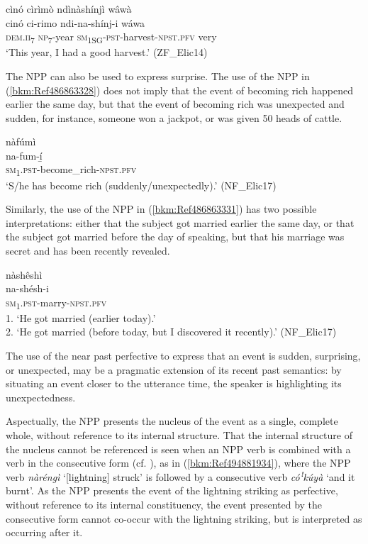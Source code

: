 \ea
\label{bkm:Ref402270667}
cìnó cìrìmò ndìnàshínjì wâwà\\
\gll cinó    ci-rimo  ndi-na-shínj-i      wáwa\\
\textsc{dem}.\textsc{ii}\textsubscript{7}  \textsc{np}\textsubscript{7}-year  \textsc{sm}\textsubscript{1SG}-\textsc{pst}-harvest-\textsc{npst}.\textsc{pfv}  very\\
\glt ‘This year, I had a good harvest.’ (ZF\_Elic14)
\z

The NPP can also be used to express surprise. The use of the NPP in (\ref{bkm:Ref486863328}) does not imply that the event of becoming rich happened earlier the same day, but that the event of becoming rich was unexpected and sudden, for instance, someone won a jackpot, or was given 50 heads of cattle.

\ea
\label{bkm:Ref486863328}
\glll nàfúmì\\
na-fum-í̲\\
\textsc{sm}\textsubscript{1}.\textsc{pst}-become\_rich-\textsc{npst}.\textsc{pfv}\\
\glt ‘S/he has become rich (suddenly/unexpectedly).’ (NF\_Elic17)
\z

Similarly, the use of the NPP in (\ref{bkm:Ref486863331}) has two possible interpretations: either that the subject got married earlier the same day, or that the subject got married before the day of speaking, but that his marriage was secret and has been recently revealed.

\ea
\label{bkm:Ref486863331}
nàshêshì\\
na-shésh-i\\
\textsc{sm}\textsubscript{1}.\textsc{pst}-marry-\textsc{npst}.\textsc{pfv}\\
1. ‘He got married (earlier today).’\\
2. ‘He got married (before today, but I discovered it recently).’ (NF\_Elic17)
\z

The use of the near past perfective to express that an event is sudden, surprising, or unexpected, may be a pragmatic extension of its recent past semantics: by situating an event closer to the utterance time, the speaker is highlighting its unexpectedness.

Aspectually, the NPP presents the nucleus of the event as a single, complete whole, without reference to its internal structure. That the internal structure of the nucleus cannot be referenced is seen when an NPP verb is combined with a verb in the consecutive form (cf. ), as in (\ref{bkm:Ref494881934}), where the NPP verb \textit{nàréngì} ‘[lightning] struck’ is followed by a consecutive verb \textit{cóꜝ}\textit{kúyà} ‘and it burnt’. As the NPP presents the event of the lightning striking as perfective, without reference to its internal constituency, the event presented by the consecutive form cannot co-occur with the lightning striking, but is interpreted as occurring after it.

